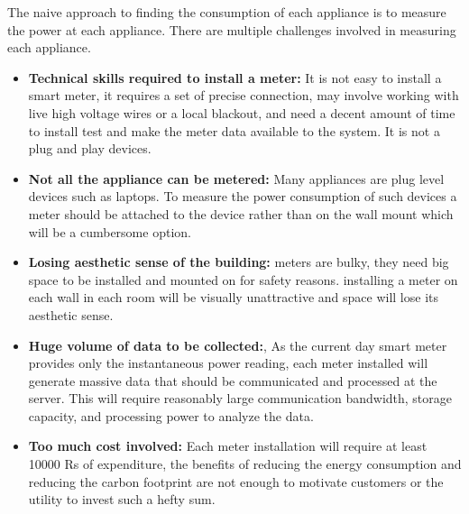 The naive approach to finding the consumption of each appliance is to measure the power at each appliance. There are multiple challenges involved in measuring each appliance.

\begin{itemize}
\item \textbf{Technical skills required to install a meter:} It is not easy to install a smart meter, it requires a set of precise connection, may involve working with live high voltage wires or a local blackout, and need a decent amount of time to install test and make the meter data available to the system. It is not a plug and play devices.
 \item \textbf{Not all the appliance can be metered:} Many appliances are plug level devices such as laptops. To measure the power consumption of such devices a meter should be attached to the device rather than on the wall mount which will be a cumbersome option.
 \item \textbf{Losing aesthetic sense of the building:} meters are bulky, they need big space to be installed and mounted on for safety reasons. installing a meter on each wall in each room will be visually unattractive and space will lose its aesthetic sense.
 \item \textbf{Huge volume of data to be collected:}, As the current day smart meter provides only the instantaneous power reading, each meter installed will generate massive data that should be communicated and processed at the server. This will require reasonably large communication bandwidth, storage capacity, and processing power to analyze the data.
 \item \textbf{Too much cost involved:} Each meter installation will require at least 10000 Rs of expenditure, the benefits of reducing the energy consumption and reducing the carbon footprint are not enough to motivate customers or the utility to invest such a hefty sum.
\end{itemize}


